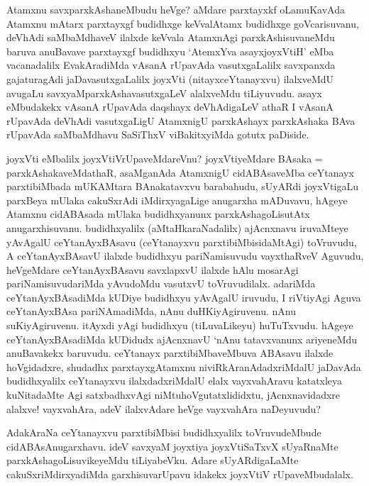 \begin{artha}%
Atamxnu savxparxkAshaneMbudu heVge? aMdare parxtayxkf oLamuKavAda Atamxnu mAtarx parxtayxgf budidhxge keVvalAtamx budidhxge goVcarisuvanu, deVhAdi saMbaMdhaveV ilalxde keVvala AtamxnAgi parxkAshisuvaneMdu baruva anuBavave parxtayxgf budidhxyu `AtemxYva asayxjoyxVtiH' eMba vacanadalilx EvakAradiMda vAsanA rUpavAda vasutxgaLalilx savxpanxda gajaturagAdi jaDavasutxgaLalilx joyxVti (nitayxceYtanayxvu) ilalxveMdU avugaLu savxyaMparxkAshavasutxgaLeV alalxveMdu tiLiyuvudu. asayx eMbudakekx vAsanA rUpavAda daqshayx deVhAdigaLeV athaR I vAsanA rUpavAda deVhAdi vasutxgaLigU AtamxnigU parxkAshayx parxkAshaka BAva rUpavAda saMbaMdhavu SaSiThxV viBakitxyiMda gotutx paDiside.
\end{artha}

\begin{artha}
joyxVti eMbalilx joyxVtiVrUpaveMdareVnu? joyxVtiyeMdare BAsaka = parxkAshakaveMdathaR, asaMganAda AtamxnigU cidABAsaveMba ceYtanayx parxtibiMbada mUKAMtara BAnakatavxvu barabahudu, sUyARdi joyxVtigaLu parxBeya mUlaka cakuSxrAdi iMdirxyagaLige anugarxha mADuvavu, hAgeye Atamxnu cidABAsada mUlaka budidhxyanunx parxkAshagoLisutAtx anugarxhisuvanu. budidhxyalilx (aMtaHkaraNadalilx) ajAcnxnavu iruvaMteye yAvAgalU ceYtanAyxBAsavu (ceYtanayxvu parxtibiMbisidaMtAgi) toVruvudu, A ceYtanAyxBAsavU ilalxde budidhxyu pariNamisuvudu vayxthaRveV Aguvudu, heVgeMdare ceYtanAyxBAsavu savxlapxvU ilalxde hAlu mosarAgi pariNamisuvudariMda yAvudoMdu vasutxvU toVruvudilalx. adariMda ceYtanAyxBAsadiMda kUDiye budidhxyu yAvAgalU iruvudu, I riVtiyAgi Aguva ceYtanAyxBAsa pariNAmadiMda, nAnu duHKiyAgiruvenu. nAnu suKiyAgiruvenu. itAyxdi yAgi budidhxyu (tiLuvaLikeyu) huTuTxvudu. hAgeye ceYtanAyxBAsadiMda kUDidudx ajAcnxnavU `nAnu tatavxvanunx ariyeneMdu anuBavakekx baruvudu. ceYtanayx parxtibiMbaveMbuva ABAsavu ilalxde hoVgidadxre, shudadhx parxtayxgAtamxnu niviRkAranAdadxriMdalU jaDavAda budidhxyalilx ceYtanayxvu ilalxdadxriMdalU elalx vayxvahAravu katatxleya kuNitadaMte Agi satxbadhxvAgi niMtuhoVgutatxlididxtu, jAcnxnavidadxre alalxve! vayxvahAra, adeV ilalxvAdare heVge vayxvahAra naDeyuvudu?
\end{artha}%

\begin{artha}
AdakAraNa ceYtanayxvu parxtibiMbisi budidhxyalilx toVruvudeMbude cidABAsAnugarxhavu. ideV savxyaM joyxtiya joyxVtiSaTxvX sUyaRnaMte parxkAshagoLisuvikeyeMdu tiLiyabeVku. Adare sUyARdigaLaMte cakuSxriMdirxyadiMda garxhisuvarUpavu idakekx joyxVtiV rUpaveMbudalalx. 
\end{artha}

